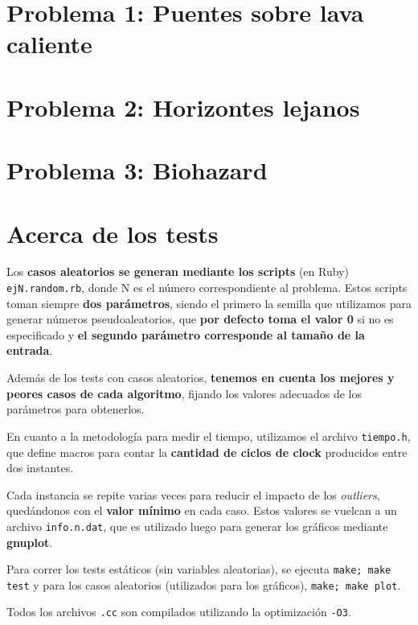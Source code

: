 \documentclass[a4paper]{article}
\begin{document}
\newpage

\section{Problema 1: Puentes sobre lava caliente}


\newpage

\section{Problema 2: Horizontes lejanos}


\newpage

\section{Problema 3: Biohazard}


\newpage
\section{Acerca de los tests}
Los \textbf{casos aleatorios se generan mediante los scripts} (en Ruby) \verb|ejN.random.rb|, donde 
N es el número correspondiente al problema. Estos scripts toman siempre \textbf{dos parámetros}, 
siendo el primero la semilla que utilizamos para generar números pseudoaleatorios, que 
\textbf{por defecto toma el valor 0} si no es especificado y \textbf{el segundo parámetro corresponde 
al tamaño de la entrada}. 

Además de los tests con casos aleatorios, \textbf{tenemos en cuenta los mejores y peores 
casos de cada algoritmo}, fijando los valores adecuados de los parámetros para 
obtenerlos.

En cuanto a la metodología para medir el tiempo, utilizamos el archivo \verb|tiempo.h|, 
que define macros para contar la \textbf{cantidad de ciclos de clock} producidos entre dos instantes. 

Cada instancia se repite varias veces para reducir el impacto de los \textit{outliers}, quedándonos 
con el \textbf{valor mínimo} en cada caso. Estos valores se vuelcan a un archivo \verb|info.n.dat|, que 
es utilizado luego para generar los gráficos mediante \textbf{gnuplot}.

Para correr los tests estáticos (sin variables aleatorias), se ejecuta \verb|make; make test| y para los 
casos aleatorios (utilizados para los gráficos), \verb|make; make plot|. 

Todos los archivos \verb|.cc| son compilados utilizando la optimización \verb|-O3|. 
  
\end{document}
